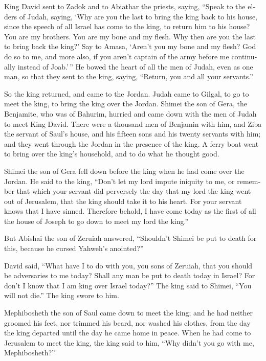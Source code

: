 \begin{paracol}{2}
\begin{otherlanguage}{english}
 King David sent to Zadok and to Abiathar the priests,
saying, ``Speak to the elders of Judah, saying, `Why are you the last to
bring the king back to his house, since the speech of all Israel has
come to the king, to return him to his house?  You are my
brothers. You are my bone and my flesh. Why then are you the last to
bring back the king?'  Say to Amasa, `Aren't you my bone
and my flesh? God do so to me, and more also, if you aren't captain of
the army before me continually instead of Joab.'\,''  He
bowed the heart of all the men of Judah, even as one man, so that they
sent to the king, saying, ``Return, you and all your servants.''

 So the king returned, and came to the Jordan. Judah came
to Gilgal, to go to meet the king, to bring the king over the Jordan.
 Shimei the son of Gera, the Benjamite, who was of
Bahurim, hurried and came down with the men of Judah to meet King David.
 There were a thousand men of Benjamin with him, and Ziba
the servant of Saul's house, and his fifteen sons and his twenty
servants with him; and they went through the Jordan in the presence of
the king.  A ferry boat went to bring over the king's
household, and to do what he thought good.

Shimei the son of Gera fell down before the king when he had come over
the Jordan.  He said to the king, ``Don't let my lord
impute iniquity to me, or remember that which your servant did
perversely the day that my lord the king went out of Jerusalem, that the
king should take it to his heart.  For your servant knows
that I have sinned. Therefore behold, I have come today as the first of
all the house of Joseph to go down to meet my lord the king.''

 But Abishai the son of Zeruiah answered, ``Shouldn't
Shimei be put to death for this, because he cursed Yahweh's anointed?''

 David said, ``What have I to do with you, you sons of
Zeruiah, that you should be adversaries to me today? Shall any man be
put to death today in Israel? For don't I know that I am king over
Israel today?''  The king said to Shimei, ``You will not
die.'' The king swore to him.

 Mephibosheth the son of Saul came down to meet the king;
and he had neither groomed his feet, nor trimmed his beard, nor washed
his clothes, from the day the king departed until the day he came home
in peace.  When he had come to Jerusalem to meet the
king, the king said to him, ``Why didn't you go with me, Mephibosheth?''


\end{otherlanguage}
\end{paracol}

